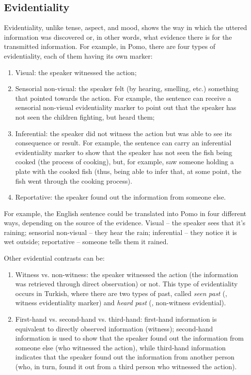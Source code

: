 \begin{refsection}
\subsection{Evidentiality}

 Evidentiality, unlike tense, aspect, and mood, shows the way in which the uttered information was discovered or, in other words, what evidence there is for the transmitted information. For example, in Pomo, there are four types of evidentiality, each of them having its own marker:

\begin{enumerate}
    \item Visual: the speaker witnessed the action;
    \item Sensorial non-visual: the speaker felt (by hearing, smelling, etc.) something that pointed towards the action. For example, the sentence  can receive a sensorial non-visual evidentiality marker to point out that the speaker has not seen the children fighting, but heard them;
    \item Inferential: the speaker did not witness the action but was able to see its consequence or result. For example, the sentence  can carry an inferential evidentiality marker to show that the speaker has not seen the fish being cooked (the process of cooking), but, for example, saw someone holding a plate with the cooked fish (thus, being able to infer that, at some point, the fish went through the cooking process).
    \item Reportative: the speaker found out the information from someone else. 
\end{enumerate}

 For example, the English sentence  could be translated into Pomo in four different ways, depending on the source of the evidence. Visual -- the speaker sees that it's raining; sensorial non-visual -- they hear the rain; inferential -- they notice it is wet outside; reportative -- someone tells them it rained.

Other evidential contrasts can be:

\begin{enumerate}[resume]\sloppy
    \item Witness vs. non-witness: the speaker witnessed the action (the information was retrieved through direct observation) or not. This type of evidentiality occurs in Turkish, where there are two types of past, called \textit{seen past} (, witness evidentiality marker) and \textit{heard past} (, non-witness evidential).
    \item First-hand vs. second-hand vs. third-hand: first-hand information is equivalent to directly observed information (witness); second-hand information is used to show that the speaker found out the information from someone else (who witnessed the action), while third-hand information indicates that the speaker found out the information from another person (who, in turn, found it out from a third person who witnessed the action).
\end{enumerate}


\end{refsection}
